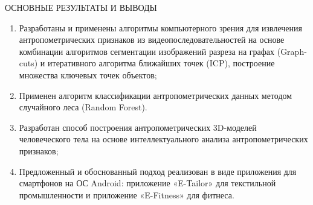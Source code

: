 \documentclass[10pt,pdf,hyperref={unicode},xcolor=table]{beamer}
\begin{document}
\begin{frame}{ОСНОВНЫЕ РЕЗУЛЬТАТЫ И ВЫВОДЫ}
\begin{enumerate}
	\item Разработаны и применены алгоритмы компьютерного зрения для  извлечения антропометрических признаков из видеопоследовательностей на основе комбинации алгоритмов сегментации изображений разреза на графах (Graph-cuts) и итеративного алгоритма ближайших точек (ICP), построение множества ключевых точек объектов;
	\item Применен алгоритм классификации антропометрических данных методом случайного леса (Random Forest).
	\item Разработан способ построения антропометрических 3D-моделей человеческого тела на основе интеллектуального анализа антропометрических признаков;
	\item Предложенный и обоснованный подход реализован в виде приложения для смартфонов на ОС Android: приложение «E-Tailor» для текстильной промышленности и приложение «E-Fitness» для фитнеса.
\end{enumerate}

\end{frame}
\end{document}
